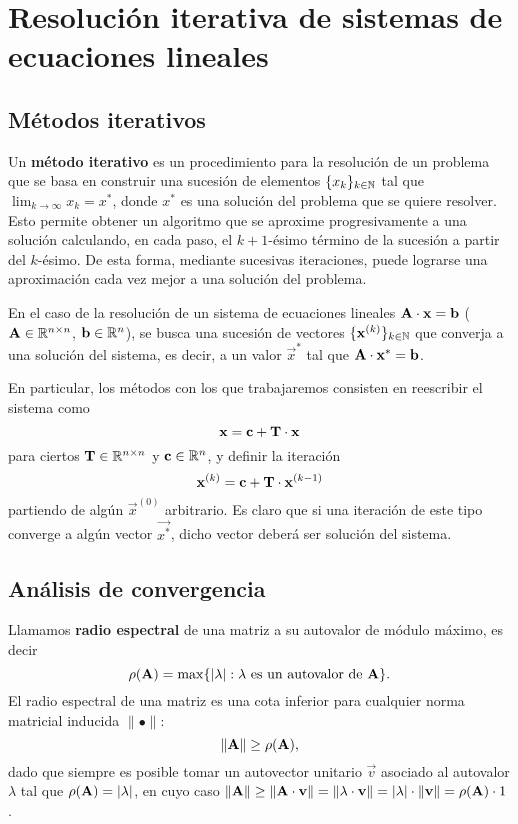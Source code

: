 
\section{Resolución iterativa de sistemas de ecuaciones lineales}
\label{section:metodos-iterativos}

\subsection{Métodos iterativos}
Un \textbf{método iterativo} es un procedimiento para la resolución de un
problema que se basa en construir una sucesión de elementos $\lbrace x_k
\rbrace_{k \in \mathbb{N}}$ tal que $\lim_{k\to\infty} x_k = x^\ast$,
donde $x^\ast$ es una solución del problema que se quiere resolver. Esto
permite obtener un algoritmo que se aproxime progresivamente a una solución
calculando, en cada paso, el $k+1$-ésimo término de la sucesión a partir del
$k$-ésimo. De esta forma, mediante sucesivas iteraciones, puede lograrse una
aproximación cada vez mejor a una solución del problema.

En el caso de la resolución de un sistema de ecuaciones lineales $\mathbf{A}
\cdot \mathbf{x} = \mathbf{b}$ ($\mathbf{A} \in \mathbb{R}^{n \times n}$,
$\mathbf{b} \in \mathbb{R}^n$), se busca una sucesión de vectores
$\lbrace \mathbf{x}^{(k)}\rbrace_{k \in \mathbb{N}}$ que converja a una solución del
sistema, es decir, a un valor $\vec{x}^\ast$ tal que
$\mathbf{A} \cdot \mathbf{x^\ast} = \mathbf{b}$.

En particular, los métodos con los que trabajaremos consisten en reescribir el
sistema como
\[ \mathbf{x} = \mathbf{c} + \mathbf{T} \cdot \mathbf{x} \]
para ciertos $\mathbf{T} \in \mathbb{R}^{n \times n}$ y $\mathbf{c} \in \mathbb{R}^{n}$,
y definir la iteración
\[ \mathbf{x}^{(k)} = \mathbf{c} + \mathbf{T} \cdot \mathbf{x}^{(k-1)} \]
partiendo de algún $\vec{x}^{(0)}$ arbitrario. Es claro que
si una iteración de este tipo converge a algún vector $\vec{x^\ast}$,
dicho vector deberá ser solución del sistema.

\subsection{Análisis de convergencia}
Llamamos \textbf{radio espectral} de una matriz a su autovalor de módulo
máximo, es decir
\[ \rho(\mathbf{A}) = \max \{ \vert \lambda \vert :
     \lambda \text{ es un autovalor de } \mathbf{A} \}. \]
El radio espectral de una matriz es una cota inferior para cualquier norma
matricial inducida $\lVert \bullet \rVert$:
\[ \lVert \mathbf{A} \rVert \geq \rho(\mathbf{A}), \]
dado que siempre es posible tomar un autovector unitario $\vec{v}$ asociado al
autovalor $\lambda$ tal que $\rho(\mathbf{A}) = \lvert \lambda \rvert$, en cuyo
caso $\lVert \mathbf{A} \rVert
    \geq \lVert \mathbf{A} \cdot \mathbf{v} \rVert
    = \lVert \lambda \cdot \mathbf{v} \rVert
    =  \lvert \lambda \rvert \cdot \lVert \mathbf{v} \rVert
    = \rho(\mathbf{A}) \cdot 1$.

